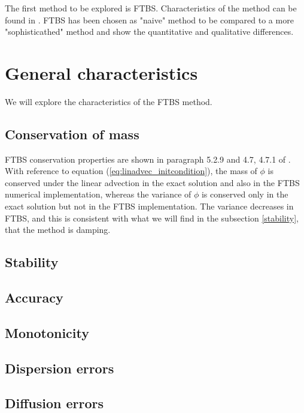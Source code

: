 

The first method to be explored is FTBS. Characteristics of the method can be found in \cite{mpebook}.
FTBS has been chosen as "naive" method to be compared to a more "sophisticathed" method and show the quantitative and qualitative differences.

\section{General characteristics}
We will explore the characteristics of the FTBS method.

\subsection{Conservation of mass} \label{conservationftbs}
FTBS conservation properties are shown in paragraph 5.2.9 \cite{mpebook} and 4.7, 4.7.1 of \cite{nmnotes}. With reference to equation (\ref{eq:linadvec_initcondition}), the mass of $\phi$ is conserved under the linear advection in the exact solution and also in the FTBS numerical implementation, whereas the variance of $\phi$ is conserved only in the exact solution but not in the FTBS implementation. The variance decreases in FTBS, and this is consistent with what we will find in the subsection \ref{stability}, that the method is damping.

\subsection{Stability} \label{stabilityftbs}


\subsection{Accuracy}

\subsection{Monotonicity}

\subsection{Dispersion errors}

\subsection{Diffusion errors}

